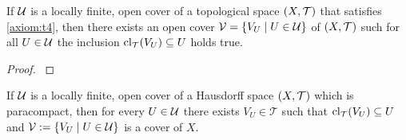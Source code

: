 \begin{lemma}\label{lemma:shrinking}
	If $\cover$ is a locally finite, open cover of a topological space $\tspace$ that satisfies \ref{axiom:t4}, then there exists an open cover $\cover[V] = \Bbraces{V_U \mid U \in \cover}$ of $\tspace$ such for all $U \in \cover$ the inclusion $\cl{V_U} \subseteq U$ holds true. 
\end{lemma}
\begin{proof}
	\cite{shrinking_lemma}
\end{proof}

\begin{lemma} \label{lemma:special_cover}
	If $\cover$ is a locally finite, open cover of a Hausdorff space $\tspace$ which is paracompact, then for every $U \in \cover$ there exists $V_U \in \mathcal{T}$ such that $\cl{V_U} \subseteq U$ and $\cover[V] := \Bbraces{V_U \mid U \in \cover}$ is a cover of $X$.  
\end{lemma}
